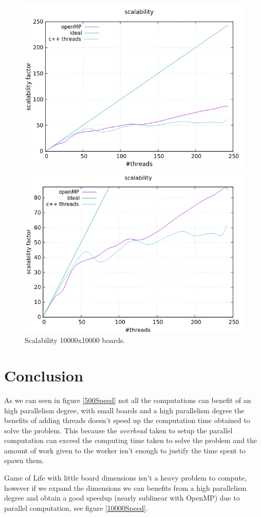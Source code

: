 \documentclass[a4paper,10pt]{article}
\begin{document}
\begin{figure}[H]
	\centering
	\begin{minipage}[t]{0.55\linewidth}
		\includegraphics[width=\linewidth]{10000_standard_scal.png}
	\end{minipage}%
	\begin{minipage}[t]{0.55\linewidth}
		\includegraphics[width=\linewidth]{10000_zoomed_scal.png}
	\end{minipage}
	\caption{Scalability 10000x10000 boards.}
	\label{10000Scal}
\end{figure}

\section{Conclusion}
As we can seen in figure \ref{500Speed} not all the computations can benefit of an high  parallelism degree, with small boards and a high parallelism degree the benefits of adding threads doesn't speed up the computation time obtained to solve the problem. This because the \textit{overhead} taken to setup the parallel computation can exceed the computing time taken to solve the problem and the amount of work given to the worker isn't enough to justify the time spent to spawn them. 

Game of Life with little board dimensions isn't a heavy problem to compute, however if we expand the dimensions we can benefits from a high parallelism degree and obtain a good speedup (nearly sublinear with OpenMP) due to parallel computation, see figure \ref{10000Speed}. 
\end{document}
